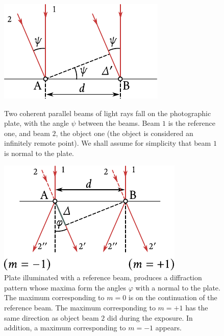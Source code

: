 \begin{figure}[t]
	\begin{minipage}[t]{0.48\linewidth}
		\begin{center}
			\includegraphics[scale=1]{figures/ch_18/fig_18_50.pdf}
	        \caption[]{Two coherent parallel beams of light rays fall on the photographic plate, with the angle $\psi$ between the beams. Beam $1$ is the reference one, and beam $2$, the object one (the object is considered an infinitely remote point). We shall assume for simplicity that beam $1$ is normal to the plate.}
			\label{fig:18_50}
		\end{center}
	\end{minipage}
	\hfill{ }%
	\begin{minipage}[t]{0.48\linewidth}
		\begin{center}
			\includegraphics[scale=1]{figures/ch_18/fig_18_51.pdf}
	        \caption[]{Plate illuminated with a reference beam, produces a diffraction pattern whose maxima form the angles $\varphi$ with a normal to the plate. The maximum corresponding to $m=0$ is on the continuation of the reference beam. The maximum corresponding to $m=+1$ has the same direction as object beam $2$ did during the exposure. In addition, a maximum corresponding to $m=-1$ appears.}
			\label{fig:18_51}
		\end{center}
	\end{minipage}
\vspace{-0.4cm}
\end{figure}

